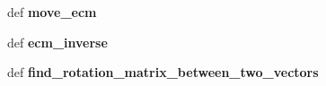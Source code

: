 \begin{DoxyCompactItemize}
\item 
\hypertarget{classclutch__move_1_1ClutchControl_a9f9cbff75e571a9333aebd6d91075751}{def {\bfseries move\-\_\-ecm}}\label{classclutch__move_1_1ClutchControl_a9f9cbff75e571a9333aebd6d91075751}

\item 
\hypertarget{classclutch__move_1_1ClutchControl_a553b9e5c98510b4af1a58c425e6bef09}{def {\bfseries ecm\-\_\-inverse}}\label{classclutch__move_1_1ClutchControl_a553b9e5c98510b4af1a58c425e6bef09}

\item 
\hypertarget{classclutch__move_1_1ClutchControl_afc8847b86a974a3d33dd45783f9e1b29}{def {\bfseries find\-\_\-rotation\-\_\-matrix\-\_\-between\-\_\-two\-\_\-vectors}}\label{classclutch__move_1_1ClutchControl_afc8847b86a974a3d33dd45783f9e1b29}

\end{DoxyCompactItemize}
